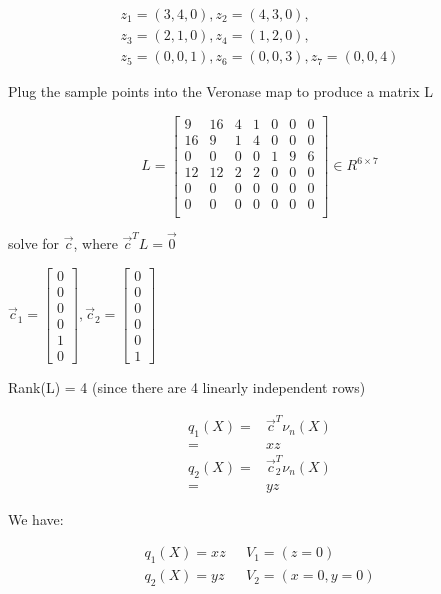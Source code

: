 \documentclass[11pt]{article}
\begin{document}
\begin{equation}
\begin{split}
z_1 = (3,4,0), z_2 = (4,3,0),\\
z_3 = (2, 1, 0), z_4 = (1, 2, 0),\\
z_5 = (0, 0, 1), z_6 = (0, 0, 3), z_7 = (0, 0, 4)
\end{split}
\end{equation}

Plug the sample points into the Veronase map to produce a matrix L

$$
L = \begin{bmatrix}
9 & 16 & 4 & 1 & 0 & 0 & 0\\
16 & 9 & 1 & 4 & 0 & 0 & 0\\
0 & 0 & 0 & 0 & 1 & 9 & 6\\
12 & 12 & 2 & 2 & 0 & 0 & 0\\
0 & 0 & 0 & 0 & 0 & 0 & 0\\
0 & 0 & 0 & 0 & 0 & 0 & 0\\
\end{bmatrix} \in R^{6 \times 7}
$$

solve for \(\vec c\), where \(\vec c^T L = \vec 0\)

\(\vec c_1 = \begin{bmatrix} 0\\ 0\\ 0\\ 0\\ 1\\ 0 \end{bmatrix}, \vec c_2 = \begin{bmatrix} 0\\ 0\\ 0\\ 0\\ 0\\ 1 \end{bmatrix}\)

Rank(L) = 4 (since there are 4 linearly independent rows)

\begin{equation}
\begin{split}
q_1(X) = & \vec c^T \nu_n (X)\\
= & xz\\
q_2(X) = & \vec c_2^T \nu_n (X)\\
= & yz
\end{split}
\end{equation}

We have:

\begin{equation}
\begin{split}
q_1(X) = xz & \ \ \ V_1 = (z = 0)\\
q_2(X) = yz & \ \ \ V_2 = (x = 0, y = 0)
\end{split}
\end{equation}
\end{document}
